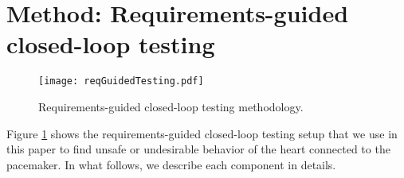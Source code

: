 \section{Method: Requirements-guided closed-loop testing}
\label{method}

\begin{figure}[!t]
	\centering
	\texttt{[image: reqGuidedTesting.pdf]}
	\caption{\small Requirements-guided closed-loop testing methodology.}
	\label{fig:reqGuidedTesting}
\end{figure} 

Figure \ref{fig:reqGuidedTesting} shows the requirements-guided closed-loop testing setup that we use in this paper to find unsafe or undesirable behavior of the heart connected to the pacemaker.
In what follows, we describe each component in details.





